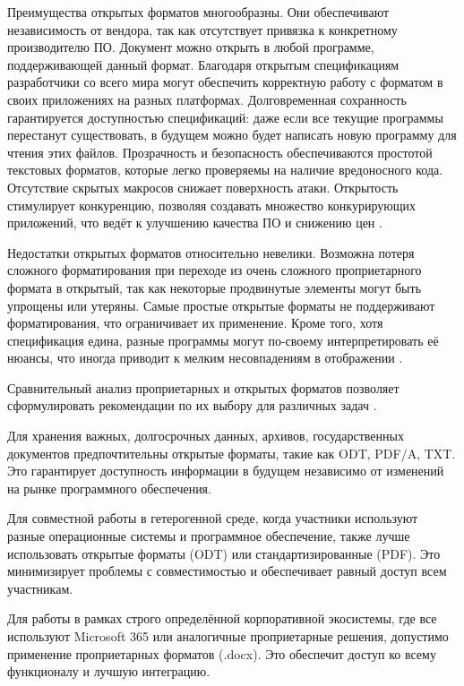 \documentclass{SibFU-docs}
\begin{document}
Преимущества открытых форматов многообразны. Они обеспечивают независимость от вендора, так как отсутствует привязка к конкретному производителю ПО. Документ можно открыть в любой программе, поддерживающей данный формат. Благодаря открытым спецификациям разработчики со всего мира могут обеспечить корректную работу с форматом в своих приложениях на разных платформах. Долговременная сохранность гарантируется доступностью спецификаций: даже если все текущие программы перестанут существовать, в будущем можно будет написать новую программу для чтения этих файлов. Прозрачность и безопасность обеспечиваются простотой текстовых форматов, которые легко проверяемы на наличие вредоносного кода. Отсутствие скрытых макросов снижает поверхность атаки. Открытость стимулирует конкуренцию, позволяя создавать множество конкурирующих приложений, что ведёт к улучшению качества ПО и снижению цен \cite{gnu2024, voronov2020}.

Недостатки открытых форматов относительно невелики. Возможна потеря сложного форматирования при переходе из очень сложного проприетарного формата в открытый, так как некоторые продвинутые элементы могут быть упрощены или утеряны. Самые простые открытые форматы не поддерживают форматирования, что ограничивает их применение. Кроме того, хотя спецификация едина, разные программы могут по-своему интерпретировать её нюансы, что иногда приводит к мелким несовпадениям в отображении \cite{petrov2022}.


Сравнительный анализ проприетарных и открытых форматов позволяет сформулировать рекомендации по их выбору для различных задач \cite{kyrjakov2018}.

Для хранения важных, долгосрочных данных, архивов, государственных документов предпочтительны открытые форматы, такие как ODT, PDF/A, TXT. Это гарантирует доступность информации в будущем независимо от изменений на рынке программного обеспечения.

Для совместной работы в гетерогенной среде, когда участники используют разные операционные системы и программное обеспечение, также лучше использовать открытые форматы (ODT) или стандартизированные (PDF). Это минимизирует проблемы с совместимостью и обеспечивает равный доступ всем участникам.

Для работы в рамках строго определённой корпоративной экосистемы, где все используют Microsoft 365 или аналогичные проприетарные решения, допустимо применение проприетарных форматов (.docx). Это обеспечит доступ ко всему функционалу и лучшую интеграцию.
\end{document}
